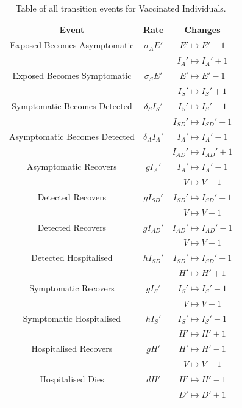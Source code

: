 \documentclass[a4paper,11pt]{article}
\theoremstyle{plain}
\theoremstyle{definition}
\begin{document}
\begin{table}[hbtp]
		\begin{center}
		    \caption{Table of all transition events for Vaccinated Individuals.}
			\begin{tabular}{ c|c|c }
				Event & Rate & Changes \\ 
	        	\hline
		        \hline
	            Exposed Becomes Asymptomatic & $\sigma_A E'$ & $E' \mapsto E' - 1$  \\
	            & & $I_A' \mapsto I_A' + 1$\\
	            \hline
	            Exposed Becomes Symptomatic & $\sigma_SE'$ &  $E' \mapsto E' - 1$ \\
	            &  & $I_S' \mapsto I_S' + 1$\\
	            \hline
	            Symptomatic Becomes Detected & $\delta_SI_S'$ & $I_S' \mapsto I_S' - 1$  \\
	            & & $I_{SD}' \mapsto I_{SD}' + 1$\\
	            \hline
	            Asymptomatic Becomes Detected & $\delta_A I_A'$ & $I_A' \mapsto I_A' - 1$  \\
	            &  & $I_{AD}' \mapsto I_{AD}' + 1$\\
	            \hline
		        Asymptomatic Recovers & $g I_A'$ & $I_A' \mapsto I_A' - 1$  \\
	            &  & $V \mapsto V + 1$\\
	            \hline
	            Detected Recovers & $g I_{SD}'$ & $I_{SD}' \mapsto I_{SD}' - 1$ \\
	             &  & $V \mapsto V + 1$\\
	            \hline
	            Detected Recovers & $g I_{AD}'$ & $I_{AD}' \mapsto I_{AD}' - 1$ \\
	             &  & $V \mapsto V + 1$\\
	            \hline
	            Detected Hospitalised & $h I_{SD}'$ & $I_{SD}' \mapsto I_{SD}' - 1$ \\
	             &  & $H' \mapsto H' + 1$\\
	            \hline
	            Symptomatic Recovers & $g I_S'$ & $I_S' \mapsto I_S' - 1$ \\
	            &  & $V \mapsto V + 1$\\
	            \hline
	            Symptomatic Hospitalised & $h I_S'$ &  $I_S' \mapsto I_S' - 1$\\
	            &  & $H' \mapsto H' + 1$\\
	            \hline
	            Hospitalised Recovers & $g H'$ & $H' \mapsto H' - 1$\\
	             &  & $V \mapsto V + 1$\\
	            \hline
	            Hospitalised Dies & $d H'$ & $H' \mapsto H' - 1$\\
	            &  & $D' \mapsto D' + 1$\\
	            \hline
			\end{tabular}
			\label{tab:B}
		\end{center}
	\end{table}
\end{document}
